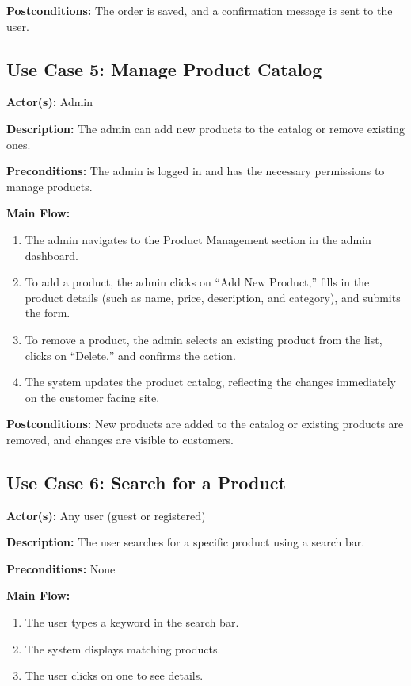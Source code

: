 \documentclass[12pt]{article}
\begin{document}
\textbf{Postconditions:} The order is saved, and a confirmation message is sent to the user.

\subsection*{Use Case 5: Manage Product Catalog}

\textbf{Actor(s):} Admin

\textbf{Description:} The admin can add new products to the catalog or remove existing ones.

\textbf{Preconditions:} The admin is logged in and has the necessary permissions to manage products.

\textbf{Main Flow:}

\begin{enumerate}
\item The admin navigates to the Product Management section in the admin dashboard.
\item To add a product, the admin clicks on ``Add New Product,'' fills in the product details (such as name, price, description, and category), and submits the form.
\item To remove a product, the admin selects an existing product from the list, clicks on ``Delete,'' and confirms the action.
\item The system updates the product catalog, reflecting the changes immediately on the customer facing site.
\end{enumerate}

\textbf{Postconditions:} New products are added to the catalog or existing products are removed, and changes are visible to customers.

\subsection*{Use Case 6: Search for a Product}

\textbf{Actor(s):} Any user (guest or registered)

\textbf{Description:} The user searches for a specific product using a search bar.

\textbf{Preconditions:} None

\textbf{Main Flow:}

\begin{enumerate}
  	\item The user types a keyword in the search bar.
  	\item The system displays matching products.
  	\item The user clicks on one to see details.
\end{enumerate}
\end{document}
